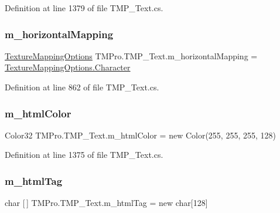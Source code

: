 Definition at line 1379 of file T\+M\+P\+\_\+\+Text.\+cs.

\mbox{\label{class_t_m_pro_1_1_t_m_p___text_a2a1bf445fc500f5b199b9e055e63d7c2}} 
\subsubsection{\texorpdfstring{m\_horizontalMapping}{m\_horizontalMapping}}
{\footnotesize\ttfamily \mbox{\hyperlink{namespace_t_m_pro_ab5c7877e6f736cba8b501c877bf5b612}{Texture\+Mapping\+Options}} T\+M\+Pro.\+T\+M\+P\+\_\+\+Text.\+m\+\_\+horizontal\+Mapping = \mbox{\hyperlink{namespace_t_m_pro_ab5662f47179bf1b81c575ecf80b24065a76a40e4f974fd895a0a2598c1cee28b4}{Texture\+Mapping\+Options.\+Character}}\hspace{0.3cm}{\ttfamily [protected]}}



Definition at line 862 of file T\+M\+P\+\_\+\+Text.\+cs.

\mbox{\label{class_t_m_pro_1_1_t_m_p___text_ad64b08c5fe4aecc521406b9b55ab1544}} 
\subsubsection{\texorpdfstring{m\_htmlColor}{m\_htmlColor}}
{\footnotesize\ttfamily Color32 T\+M\+Pro.\+T\+M\+P\+\_\+\+Text.\+m\+\_\+html\+Color = new Color(255, 255, 255, 128)\hspace{0.3cm}{\ttfamily [protected]}}



Definition at line 1375 of file T\+M\+P\+\_\+\+Text.\+cs.

\mbox{\label{class_t_m_pro_1_1_t_m_p___text_a150ea1996bea126c6976729e270cfc29}} 
\subsubsection{\texorpdfstring{m\_htmlTag}{m\_htmlTag}}
{\footnotesize\ttfamily char \mbox{[}$\,$\mbox{]} T\+M\+Pro.\+T\+M\+P\+\_\+\+Text.\+m\+\_\+html\+Tag = new char\mbox{[}128\mbox{]}\hspace{0.3cm}{\ttfamily [protected]}}



